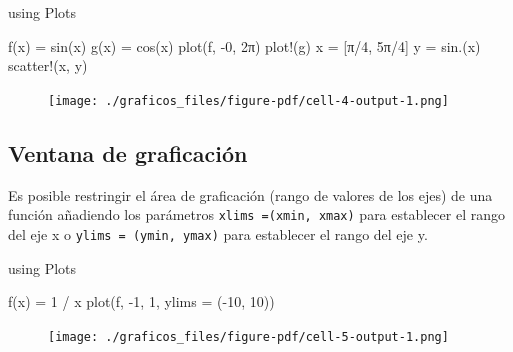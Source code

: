 \documentclass[
  letterpaper,
  DIV=11,
  numbers=noendperiod]{scrreprt}
\newenvironment{Shaded}{\begin{snugshade}}{\end{snugshade}}
\newcommand{\BuiltInTok}[1]{\textcolor[rgb]{0.00,0.23,0.31}{#1}}
\newcommand{\ConstantTok}[1]{\textcolor[rgb]{0.56,0.35,0.01}{#1}}
\newcommand{\FloatTok}[1]{\textcolor[rgb]{0.68,0.00,0.00}{#1}}
\newcommand{\FunctionTok}[1]{\textcolor[rgb]{0.28,0.35,0.67}{#1}}
\newcommand{\ImportTok}[1]{\textcolor[rgb]{0.00,0.46,0.62}{#1}}
\newcommand{\NormalTok}[1]{\textcolor[rgb]{0.00,0.23,0.31}{#1}}
\newcommand{\OperatorTok}[1]{\textcolor[rgb]{0.37,0.37,0.37}{#1}}
\begin{document}
\begin{Shaded}
\begin{Highlighting}[]
\ImportTok{using} \BuiltInTok{Plots}

\FunctionTok{f}\NormalTok{(x) }\OperatorTok{=} \FunctionTok{sin}\NormalTok{(x)}
\FunctionTok{g}\NormalTok{(x) }\OperatorTok{=} \FunctionTok{cos}\NormalTok{(x)}
\FunctionTok{plot}\NormalTok{(f, }\OperatorTok{{-}}\FloatTok{0}\NormalTok{, }\FloatTok{2}\NormalTok{π)}
\FunctionTok{plot!}\NormalTok{(g)}
\NormalTok{x }\OperatorTok{=}\NormalTok{ [}\ConstantTok{π}\OperatorTok{/}\FloatTok{4}\NormalTok{, }\FloatTok{5}\NormalTok{π}\OperatorTok{/}\FloatTok{4}\NormalTok{]}
\NormalTok{y }\OperatorTok{=} \FunctionTok{sin}\NormalTok{.(x)}
\FunctionTok{scatter!}\NormalTok{(x, y)}
\end{Highlighting}
\end{Shaded}

\begin{figure}[H]

{\centering \texttt{[image: ./graficos\_files/figure-pdf/cell-4-output-1.png]}

}

\end{figure}

\hypertarget{ventana-de-graficaciuxf3n}{%
\subsection{Ventana de graficación}\label{ventana-de-graficaciuxf3n}}

Es posible restringir el área de graficación (rango de valores de los
ejes) de una función añadiendo los parámetros
\texttt{xlims\ =(xmin,\ xmax)} para establecer el rango del eje x o
\texttt{ylims\ =\ (ymin,\ ymax)} para establecer el rango del eje y.

\begin{Shaded}
\begin{Highlighting}[]
\ImportTok{using} \BuiltInTok{Plots}

\FunctionTok{f}\NormalTok{(x) }\OperatorTok{=} \FloatTok{1} \OperatorTok{/}\NormalTok{ x}
\FunctionTok{plot}\NormalTok{(f, }\OperatorTok{{-}}\FloatTok{1}\NormalTok{, }\FloatTok{1}\NormalTok{, ylims }\OperatorTok{=}\NormalTok{ (}\OperatorTok{{-}}\FloatTok{10}\NormalTok{, }\FloatTok{10}\NormalTok{))}
\end{Highlighting}
\end{Shaded}

\begin{figure}[H]

{\centering \texttt{[image: ./graficos\_files/figure-pdf/cell-5-output-1.png]}

}

\end{figure}
\end{document}
